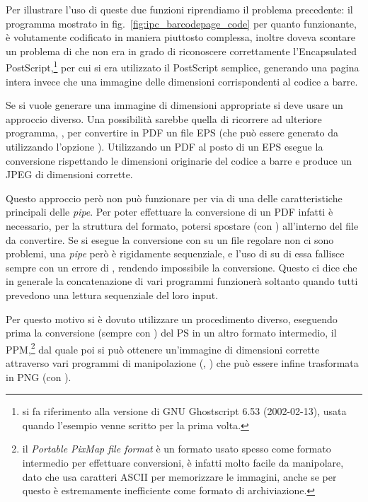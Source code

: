 Per illustrare l'uso di queste due funzioni riprendiamo il problema
precedente: il programma mostrato in fig.~\ref{fig:ipc_barcodepage_code} per
quanto funzionante, è volutamente codificato in maniera piuttosto complessa,
inoltre doveva scontare un problema di  che non era in grado di
riconoscere correttamente l'Encapsulated PostScript,\footnote{si fa
  riferimento alla versione di GNU Ghostscript 6.53 (2002-02-13), usata quando
  l'esempio venne scritto per la prima volta.} per cui si era utilizzato il
PostScript semplice, generando una pagina intera invece che una immagine delle
dimensioni corrispondenti al codice a barre.

Se si vuole generare una immagine di dimensioni appropriate si deve usare un
approccio diverso. Una possibilità sarebbe quella di ricorrere ad ulteriore
programma, , per convertire in PDF un file EPS (che può essere
generato da  utilizzando l'opzione ).  Utilizzando un PDF
al posto di un EPS  esegue la conversione rispettando le dimensioni
originarie del codice a barre e produce un JPEG di dimensioni corrette.

Questo approccio però non può funzionare per via di una delle caratteristiche
principali delle \textit{pipe}. Per poter effettuare la conversione di un PDF
infatti è necessario, per la struttura del formato, potersi spostare (con
) all'interno del file da convertire. Se si esegue la conversione
con  su un file regolare non ci sono problemi, una \textit{pipe} però
è rigidamente sequenziale, e l'uso di  su di essa fallisce sempre
con un errore di , rendendo impossibile la conversione.
Questo ci dice che in generale la concatenazione di vari programmi funzionerà
soltanto quando tutti prevedono una lettura sequenziale del loro input.

Per questo motivo si è dovuto utilizzare un procedimento diverso, eseguendo
prima la conversione (sempre con ) del PS in un altro formato
intermedio, il PPM,\footnote{il \textit{Portable PixMap file format} è un
  formato usato spesso come formato intermedio per effettuare conversioni, è
  infatti molto facile da manipolare, dato che usa caratteri ASCII per
  memorizzare le immagini, anche se per questo è estremamente inefficiente
  come formato di archiviazione.}  dal quale poi si può ottenere un'immagine
di dimensioni corrette attraverso vari programmi di manipolazione
(, ) che può essere infine trasformata in PNG (con
).

